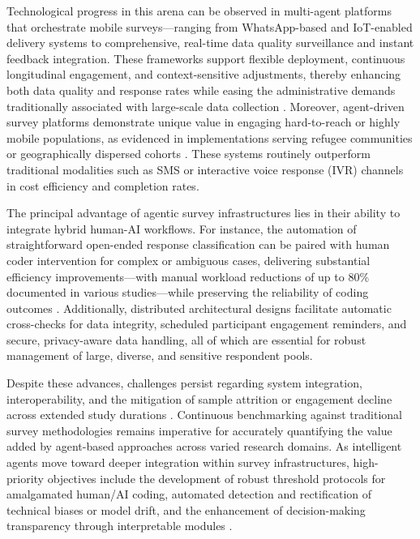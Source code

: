 \documentclass[sigconf]{acmart}
\begin{document}
Technological progress in this arena can be observed in multi-agent platforms that orchestrate mobile surveys—ranging from WhatsApp-based and IoT-enabled delivery systems to comprehensive, real-time data quality surveillance and instant feedback integration. These frameworks support flexible deployment, continuous longitudinal engagement, and context-sensitive adjustments, thereby enhancing both data quality and response rates while easing the administrative demands traditionally associated with large-scale data collection \cite{ref112}\cite{ref113}. Moreover, agent-driven survey platforms demonstrate unique value in engaging hard-to-reach or highly mobile populations, as evidenced in implementations serving refugee communities or geographically dispersed cohorts \cite{ref117}. These systems routinely outperform traditional modalities such as SMS or interactive voice response (IVR) channels in cost efficiency and completion rates.

The principal advantage of agentic survey infrastructures lies in their ability to integrate hybrid human-AI workflows. For instance, the automation of straightforward open-ended response classification can be paired with human coder intervention for complex or ambiguous cases, delivering substantial efficiency improvements—with manual workload reductions of up to 80\% documented in various studies—while preserving the reliability of coding outcomes \cite{ref112}\cite{ref113}. Additionally, distributed architectural designs facilitate automatic cross-checks for data integrity, scheduled participant engagement reminders, and secure, privacy-aware data handling, all of which are essential for robust management of large, diverse, and sensitive respondent pools.

Despite these advances, challenges persist regarding system integration, interoperability, and the mitigation of sample attrition or engagement decline across extended study durations \cite{ref117}. Continuous benchmarking against traditional survey methodologies remains imperative for accurately quantifying the value added by agent-based approaches across varied research domains. As intelligent agents move toward deeper integration within survey infrastructures, high-priority objectives include the development of robust threshold protocols for amalgamated human/AI coding, automated detection and rectification of technical biases or model drift, and the enhancement of decision-making transparency through interpretable modules \cite{ref104}\cite{ref113}.
\end{document}
